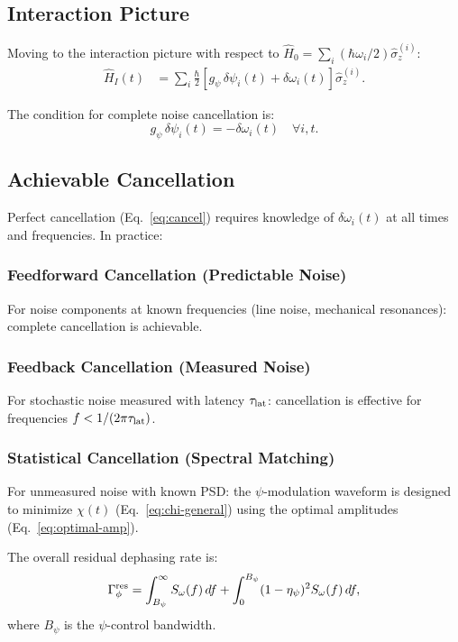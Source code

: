 \documentclass[aps,prd,twocolumn,superscriptaddress,nofootinbib]{revtex4-2}
\begin{document}
\subsection{Interaction Picture}

Moving to the interaction picture with respect to
$\hat{H}_0 = \sum_i (\hbar\omega_i/2)\hat{\sigma}_z^{(i)}$:
\begin{align}
\hat{H}_I(t) &= \sum_i \frac{\hbar}{2}\left[g_\psi\,\delta\psi_i(t)
+ \delta\omega_i(t)\right]\hat{\sigma}_z^{(i)}.
\end{align}

The condition for complete noise cancellation is:
\begin{equation}\label{eq:cancel}
g_\psi\,\delta\psi_i(t) = -\delta\omega_i(t) \quad \forall i, t.
\end{equation}

\subsection{Achievable Cancellation}

Perfect cancellation (Eq.~\ref{eq:cancel}) requires knowledge of
$\delta\omega_i(t)$ at all times and frequencies. In practice:

\subsubsection{Feedforward Cancellation (Predictable Noise)}
For noise components at known frequencies (line noise, mechanical
resonances): complete cancellation is achievable.

\subsubsection{Feedback Cancellation (Measured Noise)}
For stochastic noise measured with latency $\tau_{\rm lat}$: cancellation
is effective for frequencies $f < 1/(2\pi\tau_{\rm lat})$.

\subsubsection{Statistical Cancellation (Spectral Matching)}
For unmeasured noise with known PSD: the $\psi$-modulation waveform is
designed to minimize $\chi(t)$ (Eq.~\ref{eq:chi-general}) using the
optimal amplitudes (Eq.~\ref{eq:optimal-amp}).

The overall residual dephasing rate is:
\begin{equation}
\Gamma_\phi^{\rm res} = \int_{B_\psi}^\infty S_\omega(f)\,df
+ \int_0^{B_\psi}(1 - \eta_\psi)^2 S_\omega(f)\,df,
\end{equation}
where $B_\psi$ is the $\psi$-control bandwidth.
\end{document}
